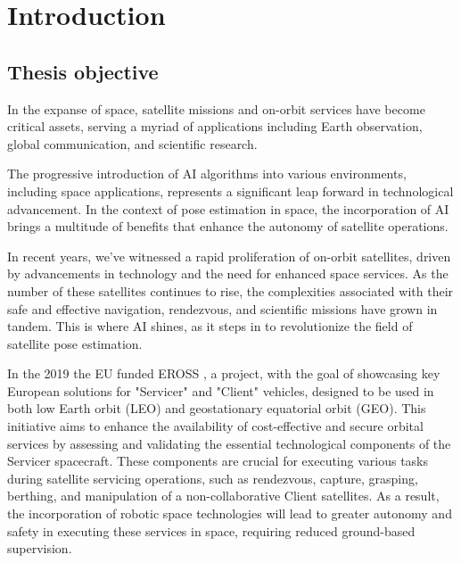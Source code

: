 \chapter{Introduction} %

\label{Chapter1} %


\section{Thesis objective}

In the expanse of space, satellite missions and on-orbit services have become critical assets, serving a myriad of applications including Earth observation, global communication, and scientific research.

The progressive introduction of AI algorithms into various environments, including space applications, represents a significant leap forward in technological advancement. In the context of pose estimation in space, the incorporation of AI brings a multitude of benefits that enhance the  autonomy of satellite operations.

In recent years, we've witnessed a rapid proliferation of on-orbit satellites, driven by advancements in technology and the need for enhanced space services. As the number of these satellites continues to rise, the complexities associated with their safe and effective navigation, rendezvous, and scientific missions have grown in tandem. This is where AI shines, as it steps in to revolutionize the field of satellite pose estimation.

In the 2019 the EU funded EROSS \cite{CORDIS_2018}, a project, with the goal of showcasing key European solutions for "Servicer" and "Client" vehicles, designed to be used in both low Earth orbit (LEO) and geostationary equatorial orbit (GEO). This initiative aims to enhance the availability of cost-effective and secure orbital services by assessing and validating the essential technological components of the Servicer spacecraft. These components are crucial for executing various tasks during satellite servicing operations, such as rendezvous, capture, grasping, berthing, and manipulation of a non-collaborative Client satellites. As a result, the incorporation of robotic space technologies will lead to greater autonomy and safety in executing these services in space, requiring reduced ground-based supervision.

